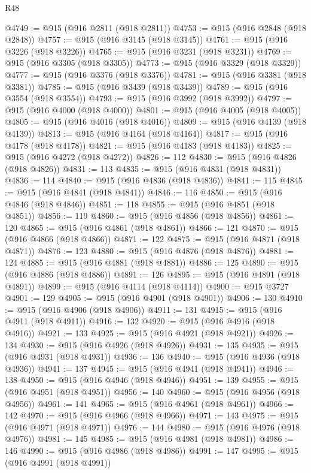 \begin{lexlean}{R48}
\begin{coremodule}
@4749 := @915 (@916 @2811 (@918 @2811))
@4753 := @915 (@916 @2848 (@918 @2848))
@4757 := @915 (@916 @3145 (@918 @3145))
@4761 := @915 (@916 @3226 (@918 @3226))
@4765 := @915 (@916 @3231 (@918 @3231))
@4769 := @915 (@916 @3305 (@918 @3305))
@4773 := @915 (@916 @3329 (@918 @3329))
@4777 := @915 (@916 @3376 (@918 @3376))
@4781 := @915 (@916 @3381 (@918 @3381))
@4785 := @915 (@916 @3439 (@918 @3439))
@4789 := @915 (@916 @3554 (@918 @3554))
@4793 := @915 (@916 @3992 (@918 @3992))
@4797 := @915 (@916 @4000 (@918 @4000))
@4801 := @915 (@916 @4005 (@918 @4005))
@4805 := @915 (@916 @4016 (@918 @4016))
@4809 := @915 (@916 @4139 (@918 @4139))
@4813 := @915 (@916 @4164 (@918 @4164))
@4817 := @915 (@916 @4178 (@918 @4178))
@4821 := @915 (@916 @4183 (@918 @4183))
@4825 := @915 (@916 @4272 (@918 @4272))
@4826 := 112
@4830 := @915 (@916 @4826 (@918 @4826))
@4831 := 113
@4835 := @915 (@916 @4831 (@918 @4831))
@4836 := 114
@4840 := @915 (@916 @4836 (@918 @4836))
@4841 := 115
@4845 := @915 (@916 @4841 (@918 @4841))
@4846 := 116
@4850 := @915 (@916 @4846 (@918 @4846))
@4851 := 118
@4855 := @915 (@916 @4851 (@918 @4851))
@4856 := 119
@4860 := @915 (@916 @4856 (@918 @4856))
@4861 := 120
@4865 := @915 (@916 @4861 (@918 @4861))
@4866 := 121
@4870 := @915 (@916 @4866 (@918 @4866))
@4871 := 122
@4875 := @915 (@916 @4871 (@918 @4871))
@4876 := 123
@4880 := @915 (@916 @4876 (@918 @4876))
@4881 := 124
@4885 := @915 (@916 @4881 (@918 @4881))
@4886 := 125
@4890 := @915 (@916 @4886 (@918 @4886))
@4891 := 126
@4895 := @915 (@916 @4891 (@918 @4891))
@4899 := @915 (@916 @4114 (@918 @4114))
@4900 := @915 @3727
@4901 := 129
@4905 := @915 (@916 @4901 (@918 @4901))
@4906 := 130
@4910 := @915 (@916 @4906 (@918 @4906))
@4911 := 131
@4915 := @915 (@916 @4911 (@918 @4911))
@4916 := 132
@4920 := @915 (@916 @4916 (@918 @4916))
@4921 := 133
@4925 := @915 (@916 @4921 (@918 @4921))
@4926 := 134
@4930 := @915 (@916 @4926 (@918 @4926))
@4931 := 135
@4935 := @915 (@916 @4931 (@918 @4931))
@4936 := 136
@4940 := @915 (@916 @4936 (@918 @4936))
@4941 := 137
@4945 := @915 (@916 @4941 (@918 @4941))
@4946 := 138
@4950 := @915 (@916 @4946 (@918 @4946))
@4951 := 139
@4955 := @915 (@916 @4951 (@918 @4951))
@4956 := 140
@4960 := @915 (@916 @4956 (@918 @4956))
@4961 := 141
@4965 := @915 (@916 @4961 (@918 @4961))
@4966 := 142
@4970 := @915 (@916 @4966 (@918 @4966))
@4971 := 143
@4975 := @915 (@916 @4971 (@918 @4971))
@4976 := 144
@4980 := @915 (@916 @4976 (@918 @4976))
@4981 := 145
@4985 := @915 (@916 @4981 (@918 @4981))
@4986 := 146
@4990 := @915 (@916 @4986 (@918 @4986))
@4991 := 147
@4995 := @915 (@916 @4991 (@918 @4991))

\end{coremodule}
\end{lexlean}
